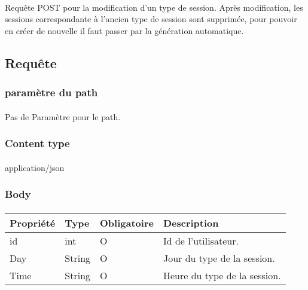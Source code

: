 \paragraph{}
	Requête POST pour la modification d'un type de session. Après modification, les sessions correspondante à l'ancien type de session sont supprimée, pour pouvoir en créer de nouvelle il faut passer par la génération automatique.

\subsection{Requête}
	\subsubsection{paramètre du path}
		\paragraph{}
			Pas de Paramètre pour le path.
	
	\subsubsection{Content type}
		\paragraph{}
			application/json
			
	\subsubsection{Body}
		\paragraph{}
			\begin{center}
				\begin{tabularx}{\textwidth}{| T{0.2122\textwidth} | S{0.22\textwidth} | S{0.15\textwidth} | S{0.3\textwidth} |}
					\hline
					Propriété & Type & Obligatoire & Description \\
					\hline
					id & int & O & Id de l'utilisateur. \\
					\hline
					Day & String & O & Jour du type de la session. \\
					\hline
					Time & String & O & Heure du type de la session. \\
					\hline
				\end{tabularx}
			\end{center}
			
